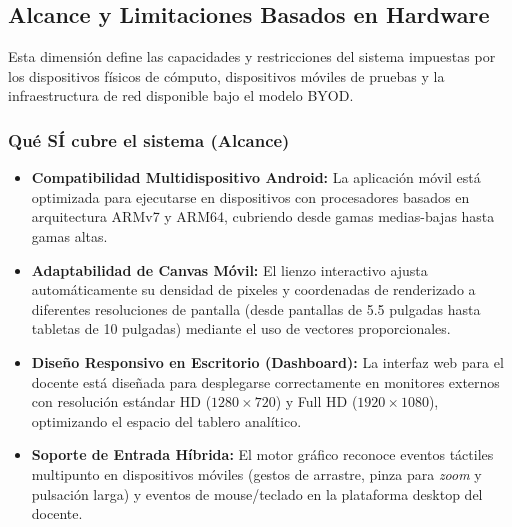 \subsection{Alcance y Limitaciones Basados en Hardware}
\label{subsec:alcance_limitaciones_hardware}

Esta dimensión define las capacidades y restricciones del sistema impuestas por los dispositivos físicos de cómputo, dispositivos móviles de pruebas y la infraestructura de red disponible bajo el modelo BYOD.

\subsubsection{Qué SÍ cubre el sistema (Alcance)}
\begin{itemize}
    \item \textbf{Compatibilidad Multidispositivo Android:} La aplicación móvil está optimizada para ejecutarse en dispositivos con procesadores basados en arquitectura ARMv7 y ARM64, cubriendo desde gamas medias-bajas hasta gamas altas.
    \item \textbf{Adaptabilidad de Canvas Móvil:} El lienzo interactivo ajusta automáticamente su densidad de pixeles y coordenadas de renderizado a diferentes resoluciones de pantalla (desde pantallas de 5.5 pulgadas hasta tabletas de 10 pulgadas) mediante el uso de vectores proporcionales.
    \item \textbf{Diseño Responsivo en Escritorio (Dashboard):} La interfaz web para el docente está diseñada para desplegarse correctamente en monitores externos con resolución estándar HD ($1280 \times 720$) y Full HD ($1920 \times 1080$), optimizando el espacio del tablero analítico.
    \item \textbf{Soporte de Entrada Híbrida:} El motor gráfico reconoce eventos táctiles multipunto en dispositivos móviles (gestos de arrastre, pinza para \textit{zoom} y pulsación larga) y eventos de mouse/teclado en la plataforma desktop del docente.
\end{itemize}

